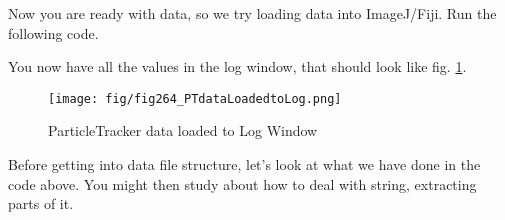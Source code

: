 \documentclass[11pt,a4paper,oneside]{report}
\begin{document}
Now you are ready with data, so we try loading data into ImageJ/Fiji. Run the following code. 



You now have all the values in the log window, that should look like fig. \ref{fig:fig264_PTdatainLogWin}. 

\begin{figure}[htbp]
\begin{center}
\texttt{[image: fig/fig264\_PTdataLoadedtoLog.png]}
\caption{ ParticleTracker data loaded to Log Window}
\label{fig:fig264_PTdatainLogWin}
\end{center}
\end{figure}

Before getting into data file structure, let's look at what we have done in the code above. 
You might then study about how to deal with string, extracting parts of it. 
\end{document}
